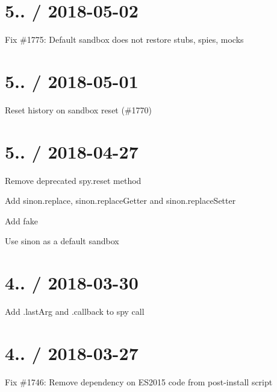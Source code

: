 \section*{5.. / 2018-\/05-\/02 }


\begin{DoxyItemize}
\item Fix \#1775\+: Default sandbox does not restore stubs, spies, mocks
\end{DoxyItemize}

\section*{5.. / 2018-\/05-\/01 }


\begin{DoxyItemize}
\item Reset history on sandbox reset (\#1770)
\end{DoxyItemize}

\section*{5.. / 2018-\/04-\/27 }


\begin{DoxyItemize}
\item Remove deprecated spy.\+reset method
\item Add sinon.\+replace, sinon.\+replace\+Getter and sinon.\+replace\+Setter
\item Add {\ttfamily fake}
\item Use {\ttfamily sinon} as a default sandbox
\end{DoxyItemize}

\section*{4.. / 2018-\/03-\/30 }


\begin{DoxyItemize}
\item Add .last\+Arg and .callback to spy call
\end{DoxyItemize}

\section*{4.. / 2018-\/03-\/27 }


\begin{DoxyItemize}
\item Fix \#1746\+: Remove dependency on E\+S2015 code from post-\/install script
\end{DoxyItemize}

